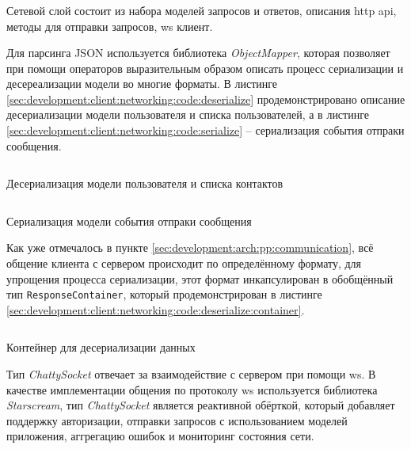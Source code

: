 \subsubsection{}
\label{sec:development:client:networking}

Сетевой слой состоит из набора моделей запросов и ответов, описания \gls{http} \gls{api}, методы для отправки запросов, \gls{ws} клиент.

Для парсинга JSON используется библиотека \textit{ObjectMapper}, которая позволяет при помощи операторов выразительным образом описать процесс сериализации и десереализации модели во многие форматы.
В листинге \ref{sec:development:client:networking:code:deserialize} продемонстрировано описание десериализации модели пользователя и списка пользователей, а в листинге \ref{sec:development:client:networking:code:serialize} -- сериализация события отпраки сообщения.

\begin{code}
	\inputminted{swift}{inc/src/deserialization.swift}
   \caption{Десериализация модели пользователя и списка контактов}
   \label{sec:development:client:networking:code:deserialize}
\end{code}

\begin{code}
	\inputminted{swift}{inc/src/serialization.swift}
   \caption{Сериализация модели события отпраки сообщения}
   \label{sec:development:client:networking:code:serialize}
\end{code}

Как уже отмечалось в пункте \ref{sec:development:arch:pp:communication}, всё общение клиента с сервером происходит по определённому формату, для упрощения процесса сериализации, этот формат инкапсулирован в обобщённый тип \texttt{ResponseContainer}, который продемонстрирован в листинге \ref{sec:development:client:networking:code:deserialize:container}.

\begin{code}
	\inputminted{swift}{inc/src/parsing_contaier.swift}
   \caption{Контейнер для десериализации данных}
   \label{sec:development:client:networking:code:deserialize:container}
\end{code}

Тип \textit{ChattySocket} отвечает за взаимодействие с сервером при помощи \gls{ws}. В качестве имплементации общения по протоколу \gls{ws} используется библиотека \textit{Starscream}, тип \textit{ChattySocket} является реактивной обёрткой, который добавляет поддержку авторизации, отправки запросов с использованием моделей приложения, аггрегацию ошибок и мониторинг состояния сети.

